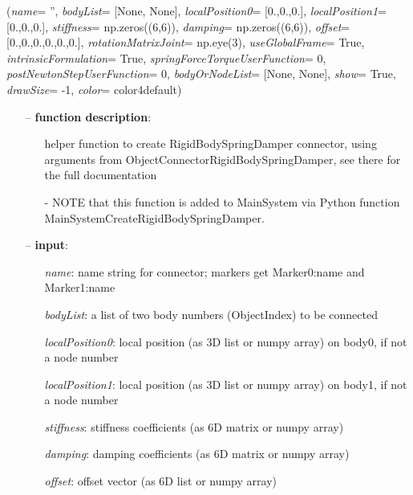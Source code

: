 %
\begin{flushleft}
\label{sec:mainsystemextensions:CreateRigidBodySpringDamper}
({\it name}= '', {\it bodyList}= [None, None], {\it localPosition0}= [0.,0.,0.], {\it localPosition1}= [0.,0.,0.], {\it stiffness}= np.zeros((6,6)), {\it damping}= np.zeros((6,6)), {\it offset}= [0.,0.,0.,0.,0.,0.], {\it rotationMatrixJoint}= np.eye(3), {\it useGlobalFrame}= True, {\it intrinsicFormulation}= True, {\it springForceTorqueUserFunction}= 0, {\it postNewtonStepUserFunction}= 0, {\it bodyOrNodeList}= [None, None], {\it show}= True, {\it drawSize}= -1, {\it color}= color4default)
\end{flushleft}
\setlength{\itemindent}{0.7cm}
\begin{itemize}[leftmargin=0.7cm]
\item[--]
{\bf function description}: \vspace{-6pt}
\begin{itemize}[leftmargin=1.2cm]
\setlength{\itemindent}{-0.7cm}
\item[]helper function to create RigidBodySpringDamper connector, using arguments from ObjectConnectorRigidBodySpringDamper, see there for the full documentation
\item[]- NOTE that this function is added to MainSystem via Python function MainSystemCreateRigidBodySpringDamper.
\end{itemize}
\item[--]
{\bf input}: \vspace{-6pt}
\begin{itemize}[leftmargin=1.2cm]
\setlength{\itemindent}{-0.7cm}
\item[]{\it name}: name string for connector; markers get Marker0:name and Marker1:name
\item[]{\it bodyList}: a list of two body numbers (ObjectIndex) to be connected
\item[]{\it localPosition0}: local position (as 3D list or numpy array) on body0, if not a node number
\item[]{\it localPosition1}: local position (as 3D list or numpy array) on body1, if not a node number
\item[]{\it stiffness}: stiffness coefficients (as 6D matrix or numpy array)
\item[]{\it damping}: damping coefficients (as 6D matrix or numpy array)
\item[]{\it offset}: offset vector (as 6D list or numpy array)

\end{itemize}
\end{itemize}
